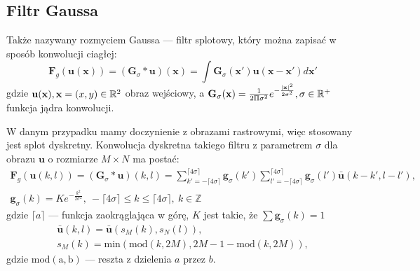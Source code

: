 \subsection{Filtr Gaussa}

   Także nazywany rozmyciem Gaussa --- filtr splotowy, który można zapisać w sposób konwolucji ciagłej:
   \begin{equation} \label{eq:gauss_c}
      \mathbf{F}_{g}(\mathbf{u}(\mathbf{x}))
      = (\mathbf{G}_{\sigma} * \mathbf{u}) (\mathbf{x})
      = \int \mathbf{G}_{\sigma}(\mathbf{x}') \mathbf{u}(\mathbf{x}-\mathbf{x}') d\mathbf{x}'
   \end{equation}
   gdzie $ \mathbf{u}(\mathbf{x}) , \smallskip \mathbf{x} = (x, y) \in \mathbb{R}^2 $ obraz wejściowy,
   a $ \mathbf{G}_{\sigma}(\mathbf{x}) = \frac{1}{2 \Pi \sigma^2} e^{-\frac{ | \mathbf{x} |^2}{2\sigma^2} },
   \smallskip \sigma \in \mathbb{R}^+ $ funkcja jądra konwolucji.

   W danym przypadku mamy doczynienie z obrazami rastrowymi, więc stosowany jest splot dyskretny. Konwolucja dyskretna takiego filtru z parametrem $\sigma$ dla obrazu $\mathbf{u}$ o rozmiarze $ M \times N $ ma postać:
   \begin{equation} \label{eq:gauss_d}
      \begin{split}
         \mathbf{F}_{g}(\mathbf{u}(k,l) )
         = (\mathbf{G}_{\sigma} * \mathbf{u}) (k,l) =
         \sum_{k' = -\lceil 4\sigma \rceil}^{\lceil 4\sigma \rceil} \mathbf{g}_{\sigma} (k')
         \sum_{l' = -\lceil 4\sigma \rceil}^{\lceil 4\sigma \rceil} \mathbf{g}_{\sigma} (l') \mathbf{\bar{u}} (k - k', l - l'),
         \\
         \mathbf{g}_{\sigma}(k) = Ke^{- \frac{k^2}{2 \sigma^2}}, \:
         -\lceil 4\sigma \rceil \leq k \leq \lceil 4\sigma \rceil, \:
         k \in \mathbb{Z}
      \end{split}
   \end{equation}
   gdzie $\lceil a \rceil$ --- funkcja zaokrąglająca w górę, $K$ jest takie, że $\sum \mathbf{g}_{\sigma} (k) = 1 $
   \begin{equation}
      \begin{split}
         \mathbf{\bar{u}}(k, l) =  \mathbf{\bar{u}} (s_M(k), s_N(l)),
         \\
         s_M(k) = \mathrm{min}(\mathrm{mod}(k, 2M), 2M - 1 - \mathrm{mod}(k, 2M)),
      \end{split}
   \end{equation}
   gdzie $ \mathrm{mod(a,b)} $ --- reszta z dzielenia $a$ przez $b$.

